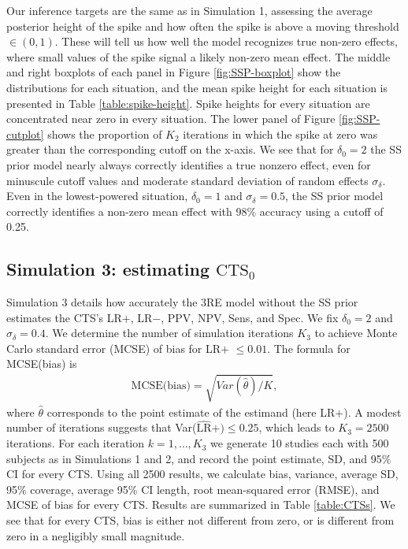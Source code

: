 \documentclass[AMA,STIX1COL]{WileyNJD-v2}
\begin{document}
Our inference targets are the same as in Simulation 1, assessing the average posterior height of the spike and how often the spike is above a moving threshold $\in (0, 1)$. These will tell us how well the model recognizes true non-zero effects, where small values of the spike signal a likely non-zero mean effect. The middle and right boxplots of each panel in Figure \ref{fig:SSP-boxplot} show the distributions for each situation, and the mean spike height for each situation is presented in Table \ref{table:spike-height}. Spike heights for every situation are concentrated near zero in every situation. The lower panel of Figure \ref{fig:SSP-cutplot} shows the proportion of $K_2$ iterations in which the spike at zero was greater than the corresponding cutoff on the x-axis. We see that for $\delta_0 = 2$ the SS prior model nearly always correctly identifies a true nonzero effect, even for minuscule cutoff values and moderate standard deviation of random effects $\sigma_\delta$. Even in the lowest-powered situation, $\delta_0 = 1$ and $\sigma_\delta = 0.5$, the SS prior model correctly identifies a non-zero mean effect with 98\% accuracy using a cutoff of 0.25. 

\subsection{Simulation 3: estimating $\mbox{CTS}_0$} \label{sec:sim_CTS}

Simulation 3 details how accurately the 3RE model without the SS prior estimates the CTS's LR$+$, LR$-$, PPV, NPV, Sens, and Spec. We fix $\delta_0 = 2$ and $\sigma_\delta = 0.4$. We determine the number of simulation iterations $K_3$ to achieve Monte Carlo standard error (MCSE) of bias for LR$+$ $\le 0.01$. The formula for MCSE(bias) is 
\begin{align}
\mbox{MCSE(bias)} = \sqrt{Var(\hat{\theta}) / K}, \nonumber 
\end{align} 
\noindent where $\hat{\theta}$ corresponds to the point estimate of the estimand (here LR+). A modest number of iterations suggests that Var($\widehat{\mbox{LR}}+) \le 0.25$, which leads to $K_3 = 2500$ iterations. For each iteration $k = 1, \dots, K_3$ we generate 10 studies each with 500 subjects as in Simulations 1 and 2, and record the point estimate, SD, and 95\% CI for every CTS. Using all 2500 results, we calculate bias, variance, average SD, 95\% coverage, average 95\% CI length, root mean-squared error (RMSE), and MCSE of bias for every CTS. Results are summarized in Table \ref{table:CTSs}. We see that for every CTS, bias is either not different from zero, or is different from zero in a negligibly small magnitude. 
\end{document}
